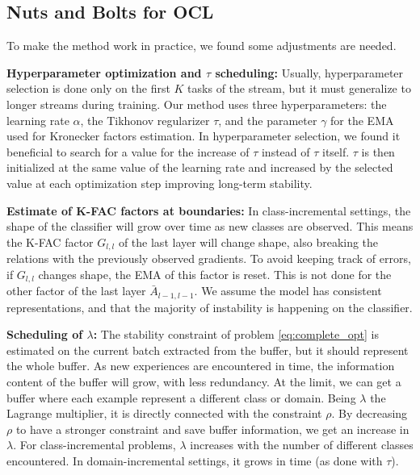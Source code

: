 \subsection{Nuts and Bolts for OCL}\label{sec:cl_nuts}

To make the method work in practice, we found some adjustments are needed. 

\textbf{Hyperparameter optimization and $\tau$ scheduling:} Usually, hyperparameter selection is done only on the first $K$ tasks of the stream, but it must generalize to longer streams during training. Our method uses three hyperparameters: the learning rate $\alpha$, the Tikhonov regularizer $\tau$, and the parameter $\gamma$ for the EMA used for Kronecker factors estimation. In hyperparameter selection, we found it beneficial to search for a value for the increase of $\tau$ instead of $\tau$ itself. $\tau$ is then initialized at the same value of the learning rate and increased by the selected value at each optimization step improving long-term stability. 

\textbf{Estimate of K-FAC factors at boundaries:} In class-incremental settings, the shape of the classifier will grow over time as new classes are observed. This means the K-FAC factor $G_{l,l}$ of the last layer will change shape, also breaking the relations with the previously observed gradients. To avoid keeping track of errors, if $G_{l,l}$ changes shape, the EMA of this factor is reset. This is not done for the other factor of the last layer $\bar{A}_{l-1,l-1}$. We assume the model has consistent representations, and that the majority of instability is happening on the classifier. 

\textbf{Scheduling of $\lambda$:} The stability constraint of problem \ref{eq:complete_opt} is estimated on the current batch extracted from the buffer, but it should represent the whole buffer. As new experiences are encountered in time, the information content of the buffer will grow, with less redundancy. At the limit, we can get a buffer where each example represent a different class or domain. Being $\lambda$ the Lagrange multiplier, it is directly connected with the constraint $\rho$. By decreasing $\rho$ to have a stronger constraint and save buffer information, we get an increase in $\lambda$. For class-incremental problems, $\lambda$ increases with the number of different classes encountered. In domain-incremental settings, it grows in time (as done with $\tau$). 

